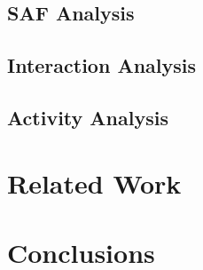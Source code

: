 \documentclass{sig-alternte-cosn}
\begin{document}


\subsection{SAF Analysis}
\label{sec:saf_analysis}



\subsection{Interaction Analysis}
\label{sec:interaction_analysis}



\subsection{Activity Analysis}
\label{sec:activity_analysis}



\section{Related Work}



\section{Conclusions}





\end{document}
